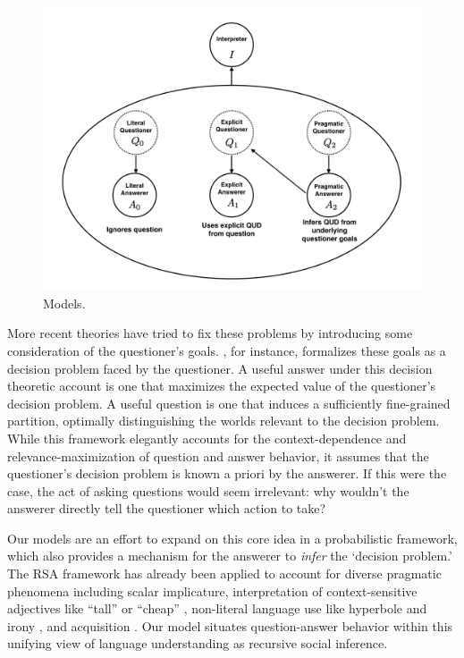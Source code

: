 \documentclass[12pt, floatsintext, jou]{apa6}
\begin{document}
 \begin{figure}[t]
\begin{center}
\includegraphics[scale = .75]{models.png}
\end{center}
\vspace{-.25cm}
\caption{Models.}
\label{fig:models}
\end{figure}

More recent theories have tried to fix these problems by introducing some consideration of the questioner's goals. , for instance, formalizes these goals as a decision problem faced by the questioner. A useful answer under this decision theoretic account is one that maximizes the expected value of the questioner's decision problem. A useful question is one that induces a sufficiently fine-grained partition, optimally distinguishing the worlds relevant to the decision problem. While this framework elegantly accounts for the context-dependence and relevance-maximization of question and answer behavior, it assumes that the questioner's decision problem is known a priori by the answerer.  If this were the case, the act of asking questions would seem irrelevant: why wouldn't the answerer directly tell the questioner which action to take?

Our models are an effort to expand on this core idea in a probabilistic framework, which also provides a mechanism for the answerer to \emph{infer} the `decision problem.' 
The RSA framework has already been applied to account for diverse pragmatic phenomena including scalar implicature\cite{GoodmanStuhlmuller13_KnowledgeImplicature}, 
interpretation of context-sensitive adjectives like ``tall'' or ``cheap'' \cite{LassiterGoodman15_AdjectivalVagueness}, 
non-literal language use like hyperbole \cite{KaoWuBergenGoodman14_NonliteralNumberWords} and irony \cite{KaoGoodman15_IronyCogSci}, 
and acquisition \cite{FrankGoodman14_InferringWordMeanings}. 
Our model situates question-answer behavior within this unifying view of language understanding as recursive social inference.
\end{document}
